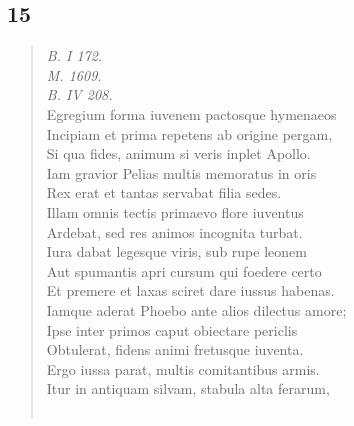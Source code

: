 \documentclass[11pt, a4paper]{report}
\begin{document}
            \subsection*{15}
      \begin{verse}
      \textit{B. I 172.} \\ \textit{M. 1609.} \\ \textit{B. IV 208.} \\ Egregium forma iuvenem pactosque hymenaeos \\ Incipiam et prima repetens ab origine pergam, \\ Si qua fides, animum si veris inplet Apollo. \\ Iam gravior Pelias multis memoratus in oris \\ Rex erat et tantas servabat filia sedes. \\ Illam omnis tectis primaevo flore iuventus \\ Ardebat, sed res animos incognita turbat. \\ Iura dabat legesque viris, sub rupe leonem \\ Aut spumantis apri cursum qui foedere certo \\ Et premere et laxas sciret dare iussus habenas. \\ Iamque aderat Phoebo ante alios dilectus amore; \\ Ipse inter primos caput obiectare periclis \\ Obtulerat, fidens animi fretusque iuventa. \\ Ergo iussa parat, multis comitantibus armis. \\ Itur in antiquam silvam, stabula alta ferarum, \\ 
        ﻿\pagebreak 

\end{verse}
\end{document}
